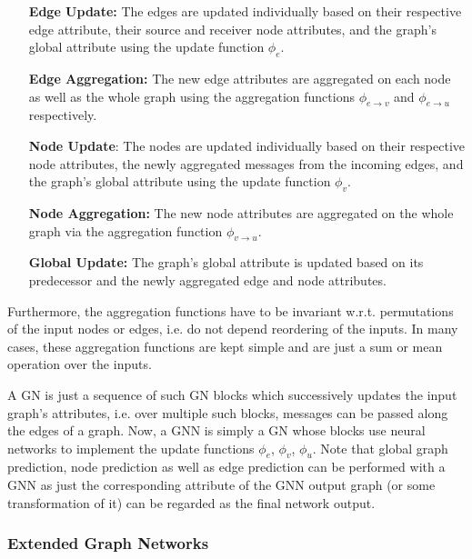 \begin{enumerate}[align=left]
    \item[\textbf{Edge Update:}] The edges are updated individually based on their respective edge attribute, 
    their source and receiver node attributes, and the graph's global attribute using the
    update function $\phi_e$.
    \item[\textbf{Edge Aggregation:}] The new edge attributes are aggregated on each node
    as well as the whole graph using the aggregation functions $\phi_{e \to v}$ and
    $\phi_{e \to u}$ respectively.
    \item[\textbf{Node Update}:] The nodes are updated individually based on their respective
    node attributes, the newly aggregated messages from the incoming edges, and the graph's
    global attribute using the update function $\phi_v$.
    \item[\textbf{Node Aggregation:}] The new node attributes are aggregated on the whole
    graph via the aggregation function $\phi_{v \to u}$.
    \item[\textbf{Global Update:}] The graph's global attribute is updated based on its
    predecessor and the newly aggregated edge and node attributes.
\end{enumerate}



Furthermore, the aggregation functions have to be invariant w.r.t. permutations of the
input nodes or edges, i.e. do not depend reordering of the inputs. In many cases,
these aggregation functions are kept simple and are just a sum or mean operation over
the inputs.

A GN is just a sequence of such GN blocks which successively updates the input graph's
attributes, i.e. over multiple such blocks, messages can be passed along the edges of
a graph. Now, a GNN is simply a GN whose blocks use neural networks to implement the
update functions $\phi_e$, $\phi_v$, $\phi_u$. Note that global graph prediction, 
node prediction as well as edge prediction can be performed with a GNN as just
the corresponding attribute of the GNN output graph (or some transformation of it) can 
be regarded as the final network output.

\subsubsection{Extended Graph Networks}
\label{subsubsec:egns}

